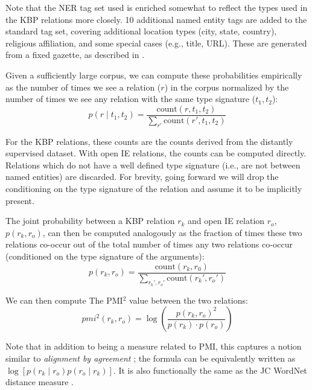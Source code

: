 Note that the NER tag set used is enriched somewhat to reflect the types used
  in the KBP relations more closely. 
10 additional named entity tags are added to the standard tag set, covering
  additional location types (city, state, country), religious affiliation,
  and some special cases (e.g., title, URL).
These are generated from a fixed gazette, as described in
  .

Given a sufficiently large corpus, we can compute these probabilities
  empirically as the number of times we see a relation ($r$)
  in the corpus normalized by the number of times we see any relation with the 
  same type signature ($t_1, t_2$):
\begin{equation*}
  p(r \mid t_1, t_2) = \frac{
    \textrm{count}(r, t_1, t_2)
  }{
    \sum_{r'}\textrm{count}(r', t_1, t_2)
  }
\end{equation*}

For the KBP relations, these counts are the counts derived from the distantly
  supervised dataset.
With open IE relations, the counts can be computed directly.
Relations which do not have a well defined type signature (i.e., are not
  between named entities) are discarded.
For brevity, going forward we will drop the conditioning on the type signature
  of the relation and assume it to be implicitly present.

The joint probability between a KBP relation $r_k$ and open IE relation
  $r_o$, $p(r_k, r_o)$, can then be computed analogously as the fraction of
  times these two relations co-occur out of the total number of times any two
  relations co-occur (conditioned on the type signature of the arguments):
\begin{equation*}
  p(r_k, r_o) = \frac{
    \textrm{count}(r_k, r_0)
  }{
    \sum_{r_k', r_o'}\textrm{count}(r_k', r_o')
  }
\end{equation*}

We can then compute The PMI$^2$ value between the two relations:
\begin{equation*}
  pmi^2(r_k, r_o) = \log \left( \frac{p(r_k, r_o)^2}{p(r_k) \cdot p(r_o)} \right)
\end{equation*}

Note that in addition to being a measure related to PMI, this captures
  a notion similar to \textit{alignment by agreement} 
  \cite{key:2006liang-alignment};
  the formula can be equivalently written as 
  $\log \left[ p(r_k \mid r_o) p(r_o \mid r_k)\right]$.
It is also functionally the same as the JC WordNet distance measure
  \cite{key:1997jc-similarity}.

